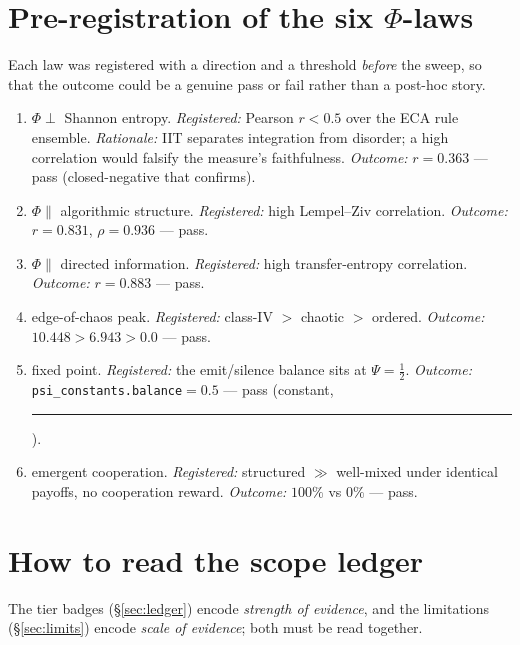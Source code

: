 \documentclass[11pt,a4paper]{article}
\newcommand{\tierdisc}[1]{\textcolor{#1}{\rule[0.05ex]{1.0ex}{1.0ex}}}
\newcommand{\tierBlue}{\tierdisc{blue!70!black}}
\begin{document}
\appendix
\section{Pre-registration of the six \texorpdfstring{$\Phi$}{Phi}-laws}
\label{app:prereg}
Each law was registered with a direction and a threshold \emph{before} the sweep,
so that the outcome could be a genuine pass or fail rather than a post-hoc story.

\begin{enumerate}
\item[\textbf{L1}] $\Phi \perp$ Shannon entropy. \emph{Registered:} Pearson
$r<0.5$ over the ECA rule ensemble. \emph{Rationale:} IIT separates integration
from disorder; a high correlation would falsify the measure's faithfulness.
\emph{Outcome:} $r=0.363$ --- pass (closed-negative that confirms).
\item[\textbf{L2}] $\Phi \parallel$ algorithmic structure. \emph{Registered:}
high Lempel--Ziv correlation. \emph{Outcome:} $r=0.831$, $\rho=0.936$ --- pass.
\item[\textbf{L3}] $\Phi \parallel$ directed information. \emph{Registered:} high
transfer-entropy correlation. \emph{Outcome:} $r=0.883$ --- pass.
\item[\textbf{L4}] edge-of-chaos peak. \emph{Registered:} class-IV $>$ chaotic
$>$ ordered. \emph{Outcome:} $10.448 > 6.943 > 0.0$ --- pass.
\item[\textbf{L5}] fixed point. \emph{Registered:} the emit/silence balance sits
at $\Psi=\tfrac12$. \emph{Outcome:} \texttt{psi\_constants.balance}$=0.5$ ---
pass (constant, \tierBlue{}).
\item[\textbf{L6}] emergent cooperation. \emph{Registered:} structured $\gg$
well-mixed under identical payoffs, no cooperation reward. \emph{Outcome:}
$100\%$ vs $0\%$ --- pass.
\end{enumerate}

\section{How to read the scope ledger}
\label{app:scope}
The tier badges (\S\ref{sec:ledger}) encode \emph{strength of evidence}, and the
limitations (\S\ref{sec:limits}) encode \emph{scale of evidence}; both must be
read together.
\end{document}
